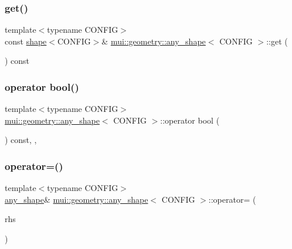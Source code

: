 \subsubsection{\texorpdfstring{get()}{get()}\hspace{0.1cm}{\footnotesize\ttfamily [2/2]}}
{\footnotesize\ttfamily template$<$typename C\+O\+N\+F\+IG$>$ \\
const \hyperlink{classmui_1_1geometry_1_1shape}{shape}$<$C\+O\+N\+F\+IG$>$\& \hyperlink{classmui_1_1geometry_1_1any__shape}{mui\+::geometry\+::any\+\_\+shape}$<$ C\+O\+N\+F\+IG $>$\+::get (\begin{DoxyParamCaption}{ }\end{DoxyParamCaption}) const\hspace{0.3cm}{\ttfamily [inline]}}

\mbox{\label{classmui_1_1geometry_1_1any__shape_ac8ca4985eeda1228a465a8ee0eef743f}} 
\subsubsection{\texorpdfstring{operator bool()}{operator bool()}}
{\footnotesize\ttfamily template$<$typename C\+O\+N\+F\+IG$>$ \\
\hyperlink{classmui_1_1geometry_1_1any__shape}{mui\+::geometry\+::any\+\_\+shape}$<$ C\+O\+N\+F\+IG $>$\+::operator bool (\begin{DoxyParamCaption}{ }\end{DoxyParamCaption}) const\hspace{0.3cm}{\ttfamily [inline]}, {\ttfamily [explicit]}, {\ttfamily [noexcept]}}

\mbox{\label{classmui_1_1geometry_1_1any__shape_aadfe3d85f7cb88e8940b6812122023b1}} 
\subsubsection{\texorpdfstring{operator=()}{operator=()}}
{\footnotesize\ttfamily template$<$typename C\+O\+N\+F\+IG$>$ \\
\hyperlink{classmui_1_1geometry_1_1any__shape}{any\+\_\+shape}\& \hyperlink{classmui_1_1geometry_1_1any__shape}{mui\+::geometry\+::any\+\_\+shape}$<$ C\+O\+N\+F\+IG $>$\+::operator= (\begin{DoxyParamCaption}\item[{\hyperlink{classmui_1_1geometry_1_1any__shape}{any\+\_\+shape}$<$ C\+O\+N\+F\+IG $>$}]{rhs }\end{DoxyParamCaption})\hspace{0.3cm}{\ttfamily [inline]}}

